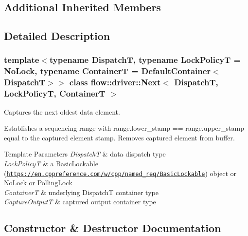 \subsection*{Additional Inherited Members}


\subsection{Detailed Description}
\subsubsection*{template$<$typename DispatchT, typename Lock\+PolicyT = No\+Lock, typename ContainerT = Default\+Container$<$\+Dispatch\+T$>$$>$\newline
class flow\+::driver\+::\+Next$<$ Dispatch\+T, Lock\+Policy\+T, Container\+T $>$}

Captures the next oldest data element. 

Establishes a sequencing range with {\ttfamily range.\+lower\+\_\+stamp == range.\+upper\+\_\+stamp} equal to the captured element stamp. Removes captured element from buffer.


\begin{DoxyTemplParams}{Template Parameters}
{\em DispatchT} & data dispatch type \\
\hline
{\em Lock\+PolicyT} & a Basic\+Lockable (\href{https://en.cppreference.com/w/cpp/named_req/BasicLockable}{\tt https\+://en.\+cppreference.\+com/w/cpp/named\+\_\+req/\+Basic\+Lockable}) object or \hyperlink{structflow_1_1_no_lock}{No\+Lock} or \hyperlink{structflow_1_1_polling_lock}{Polling\+Lock} \\
\hline
{\em ContainerT} & underlying {\ttfamily DispatchT} container type \\
\hline
{\em Capture\+OutputT} & captured output container type \\
\hline
\end{DoxyTemplParams}


\subsection{Constructor \& Destructor Documentation}
\mbox{\label{classflow_1_1driver_1_1_next_adff85b386770f4322df5903214852f32}} 
